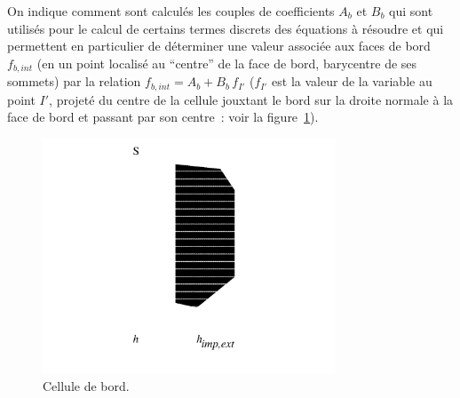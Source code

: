On indique comment sont calcul\'es les couples de coefficients 
$A_b$ et $B_b$ qui sont utilis\'es pour le calcul de certains 
termes discrets des \'equations \`a r\'esoudre et qui
permettent  en particulier de d\'eterminer une valeur associ\'ee aux faces 
de bord $f_{b,int}$ (en un point localis\'e au ``centre'' de la face de bord, 
barycentre de ses sommets) par la
relation $f_{b,int} = A_b+B_b\,f_{I'}$ ($f_{I'}$ est la valeur de 
la variable au point
$I'$, projet\'e du centre de la cellule jouxtant le bord sur la droite 
normale \`a 
la face de bord et passant par son centre~: voir la figure~\ref{Base_Clptur_fig_flux_clptur}). 

\begin{figure}[h]
\centerline{\includegraphics[height=7cm]{../Base/Clptur/Images/fluxbord.pdf}}
\caption{\label{Base_Clptur_fig_flux_clptur}Cellule de bord.}
\end{figure}

